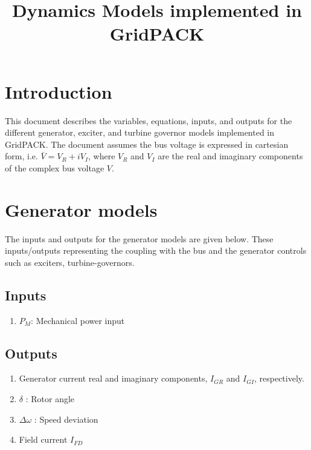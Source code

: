 \documentclass[12pt]{article}
\newcommand{\dw}{\Delta\omega}
\begin{document}

\title{Dynamics Models implemented in GridPACK}

\maketitle

\section{Introduction}
This document describes the variables, equations, inputs, and outputs for the different generator, exciter, and turbine governor models implemented in GridPACK.
The document assumes the bus voltage is expressed in cartesian form, i.e. $\bar{V} = V_R + iV_I$, where
$V_R$ and $V_I$ are the real and imaginary components of the complex bus voltage $V$.

\section{Generator models}
The inputs and outputs for the generator models are given below. These inputs/outputs representing
the coupling with the bus and the generator controls such as exciters, turbine-governors.
\subsection{Inputs}
\begin{enumerate}
  \item $P_M$: Mechanical power input
\end{enumerate}

\subsection{Outputs}
\begin{enumerate}
  \item Generator current real and imaginary components, $I_{GR}$ and $I_{GI}$, respectively.
  \item $\delta$ : Rotor angle
  \item $\dw$ : Speed deviation
  \item Field current $I_{FD}$
\end{enumerate}
\end{document}
